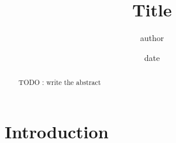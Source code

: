 \documentclass{article}
\begin{document}

\title{Title}
\author{author}
\date{date}
\maketitle


\newpage
\begin{abstract}
TODO : write the abstract
\end{abstract}

\newpage
\tableofcontents

\newpage
\section{Introduction}


%
\end{document}
